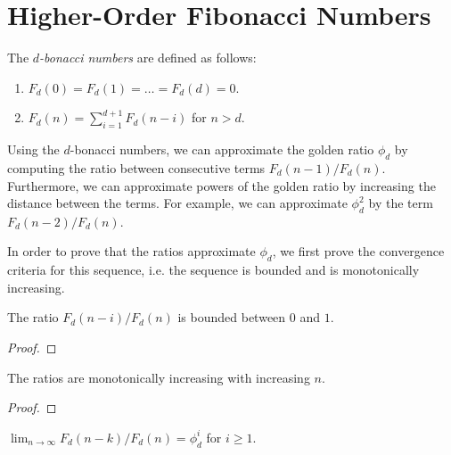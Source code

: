 \documentclass[english,version-2020-11]{uzl-thesis}
\begin{document}
\section{Higher-Order Fibonacci Numbers}

\begin{definition}
  The \emph{$d$-bonacci numbers} are defined as follows:
  \begin{enumerate}
    \item $F_d(0) = F_d(1) = \dots = F_d(d) = 0$.
    \item $F_d(n) = \sum_{i = 1}^{d+1} F_d(n - i)$ for $n > d$.
  \end{enumerate}
\end{definition}

Using the $d$-bonacci numbers, we can approximate the golden ratio $\phi_d$
by computing the ratio between consecutive terms $F_d(n - 1) / F_d(n)$.
Furthermore, we can approximate powers of the golden ratio by increasing the distance between the terms.
For example, we can approximate $\phi_d^2$ by the term $F_d(n - 2) / F_d(n)$.

In order to prove that the ratios approximate $\phi_d$,
we first prove the convergence criteria for this sequence, i.e.
the sequence is bounded and is monotonically increasing.

\begin{lemma}
  The ratio $F_d(n - i) / F_d(n)$ is bounded between $0$ and $1$.
\end{lemma}

\begin{proof}

\end{proof}

\begin{lemma}
  The ratios are monotonically increasing with increasing $n$.
\end{lemma}

\begin{proof}

\end{proof}

\begin{theorem}
  $\lim_{n \to \infty} F_d(n - k) / F_d(n) = \phi_d^i$ for $i \ge 1$.
\end{theorem}
\end{document}
